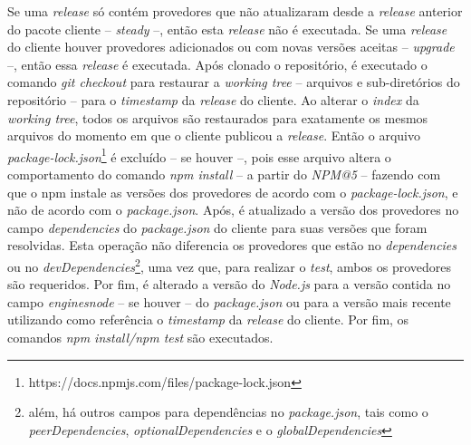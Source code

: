 Se uma \textit{release} só contém provedores que não atualizaram desde a \textit{release} anterior do pacote cliente -- \textit{steady} --, então esta \textit{release} não é executada. Se uma \textit{release} do cliente houver provedores adicionados ou com novas versões aceitas -- \textit{upgrade} --, então essa \textit{release} é executada. Após clonado o repositório, é executado o comando \textit{git checkout} para restaurar a \textit{working tree} -- arquivos e sub-diretórios do repositório -- para o \textit{timestamp} da \textit{release} do cliente. Ao alterar o \textit{index} da \textit{working tree}, todos os arquivos são restaurados para exatamente os mesmos arquivos do momento em que o cliente publicou a \textit{release}. Então o arquivo \textit{package-lock.json}\footnote{https://docs.npmjs.com/files/package-lock.json} é excluído -- se houver --, pois esse arquivo altera o comportamento do comando \textit{npm install} -- a partir do \textit{NPM@5} -- fazendo com que o \gls{npm} instale as versões dos provedores de acordo com o \textit{package-lock.json}, e não de acordo com o \textit{package.json}. Após, é atualizado a versão dos provedores no campo \textit{dependencies} do \textit{package.json} do cliente para suas versões que foram resolvidas. Esta operação não diferencia os provedores que estão no \textit{dependencies} ou no \textit{devDependencies}\footnote{além, há outros campos para dependências no \textit{package.json}, tais como o \textit{peerDependencies}, \textit{optionalDependencies} e o \textit{globalDependencies}}, uma vez que, para realizar o \textit{test}, ambos os provedores são requeridos. Por fim, é alterado a versão do \textit{Node.js} para a versão contida no campo \textit{engines\textrightarrow node} -- se houver -- do \textit{package.json} ou para a versão mais recente utilizando como referência o \textit{timestamp} da \textit{release} do cliente. Por fim, os comandos \textit{npm install/npm test} são executados.

